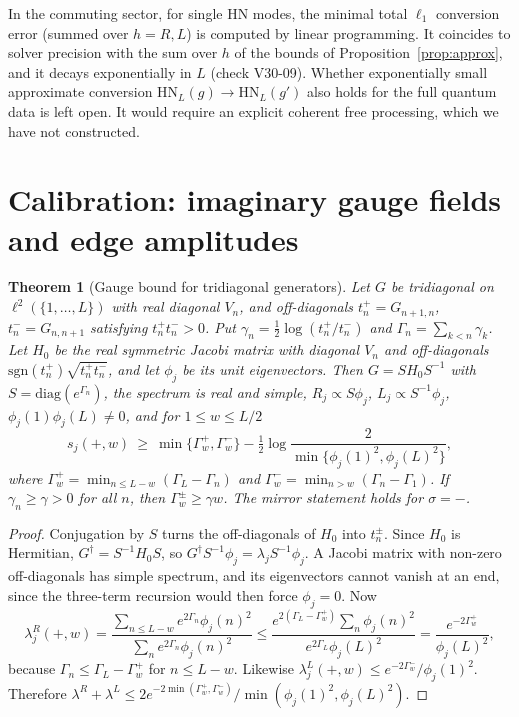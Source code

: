 \documentclass[11pt]{article}
\newtheorem{theorem}{Theorem}
\theoremstyle{definition}
\theoremstyle{remark}
\begin{document}
In the commuting sector, for single HN modes, the minimal total $\ell_1$ conversion error (summed over $h=R,L$) is computed by linear programming. It coincides to solver precision with the sum over $h$ of the bounds of Proposition~\ref{prop:approx}, and it decays exponentially in $L$ (check V30-09). Whether exponentially small approximate conversion $\mathrm{HN}_L(g)\to\mathrm{HN}_L(g')$ also holds for the full quantum data is left open. It would require an explicit coherent free processing, which we have not constructed.

\section{Calibration: imaginary gauge fields and edge amplitudes}
\label{sec:calib}

\begin{theorem}[Gauge bound for tridiagonal generators]\label{thm:gauge}
Let $G$ be tridiagonal on $\ell^2(\{1,\dots,L\})$ with real diagonal $V_n$, and off-diagonals $t^+_n=G_{n+1,n}$, $t^-_n=G_{n,n+1}$ satisfying $t^+_nt^-_n>0$. Put $\gamma_n=\frac12\log(t^+_n/t^-_n)$ and $\Gamma_n=\sum_{k<n}\gamma_k$. Let $H_0$ be the real symmetric Jacobi matrix with diagonal $V_n$ and off-diagonals $\mathrm{sgn}(t^+_n)\sqrt{t^+_nt^-_n}$, and let $\phi_j$ be its unit eigenvectors. Then $G=SH_0S^{-1}$ with $S=\mathrm{diag}(e^{\Gamma_n})$, the spectrum is real and simple, $R_j\propto S\phi_j$, $L_j\propto S^{-1}\phi_j$, $\phi_j(1)\phi_j(L)\ne0$, and for $1\le w\le L/2$
\[
s_j(+,w)\ \ge\ \min\{\Gamma^+_w,\Gamma^-_w\}-\tfrac12\log\frac{2}{\min\{\phi_j(1)^2,\phi_j(L)^2\}},
\]
where $\Gamma^+_w=\min_{n\le L-w}(\Gamma_L-\Gamma_n)$ and $\Gamma^-_w=\min_{n>w}(\Gamma_n-\Gamma_1)$.
If $\gamma_n\ge\gamma>0$ for all $n$, then $\Gamma^\pm_w\ge\gamma w$. The mirror statement holds for $\sigma=-$.
\end{theorem}
\begin{proof}
Conjugation by $S$ turns the off-diagonals of $H_0$ into $t^\pm_n$. Since $H_0$ is Hermitian, $G^\dagger=S^{-1}H_0S$, so $G^\dagger S^{-1}\phi_j=\lambda_jS^{-1}\phi_j$. A Jacobi matrix with non-zero off-diagonals has simple spectrum, and its eigenvectors cannot vanish at an end, since the three-term recursion would then force $\phi_j=0$. Now
\[
\lambda^R_j(+,w)=\frac{\sum_{n\le L-w}e^{2\Gamma_n}\phi_j(n)^2}{\sum_ne^{2\Gamma_n}\phi_j(n)^2}\le\frac{e^{2(\Gamma_L-\Gamma^+_w)}\sum_n\phi_j(n)^2}{e^{2\Gamma_L}\phi_j(L)^2}=\frac{e^{-2\Gamma^+_w}}{\phi_j(L)^2},
\]
because $\Gamma_n\le\Gamma_L-\Gamma^+_w$ for $n\le L-w$. Likewise $\lambda^L_j(+,w)\le e^{-2\Gamma^-_w}/\phi_j(1)^2$. Therefore $\lambda^R+\lambda^L\le2e^{-2\min(\Gamma^+_w,\Gamma^-_w)}/\min(\phi_j(1)^2,\phi_j(L)^2)$.
\end{proof}
\end{document}
